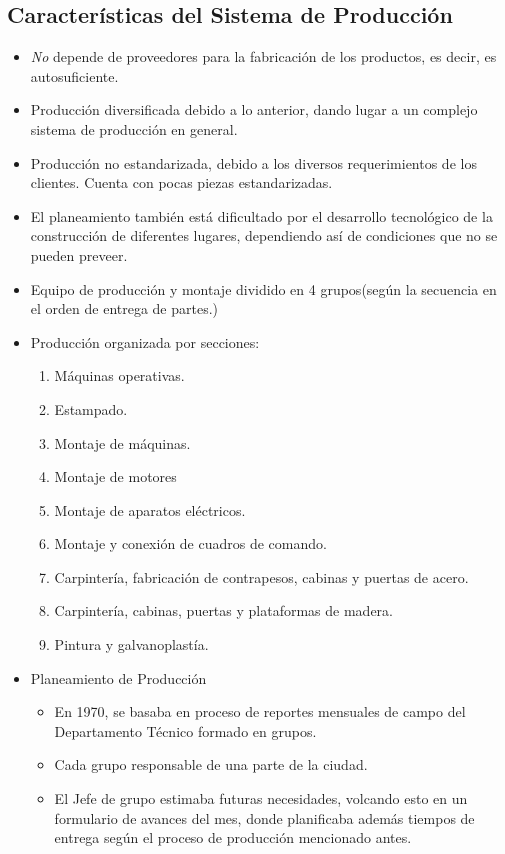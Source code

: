 \documentclass[12pt,a4paper,spanish]{article}
\begin{document}
\subsection{Caracter\'{i}sticas del Sistema de Producci\'{o}n}
\begin{itemize}
	\item \emph{No} depende de proveedores para la fabricaci\'{o}n de los productos, es decir, es autosuficiente.
	\item Producci\'{o}n diversificada debido a lo anterior, dando lugar a un complejo sistema de producci\'on en general.
	\item Producci\'{o}n no estandarizada, debido a los diversos requerimientos de los clientes. Cuenta con pocas piezas estandarizadas.
	\item El planeamiento tambi\'{e}n est\'a dificultado por el desarrollo tecnol\'ogico de la construcci\'on de diferentes lugares, dependiendo as\'i de condiciones que no se pueden preveer.
	\item Equipo de producci\'{o}n y montaje dividido en 4 grupos(seg\'{u}n la secuencia en el orden de entrega de partes.)
	\item Producci\'{o}n organizada por secciones:
	\begin{enumerate}
		\item M\'{a}quinas operativas.
		\item Estampado.
		\item Montaje de m\'{a}quinas.
		\item Montaje de motores
		\item Montaje de aparatos el\'{e}ctricos.
		\item Montaje y conexi\'{o}n de cuadros de comando.
		\item Carpinter\'{i}a, fabricaci\'{o}n de contrapesos, cabinas y 	puertas de acero.
		\item Carpinter\'ia, cabinas, puertas y plataformas de madera.
		\item Pintura y galvanoplast\'ia.
	\end{enumerate}
	\item Planeamiento de Producci\'{o}n
	\begin{itemize}
		\item En 1970, se basaba en proceso de reportes mensuales de campo del Departamento T\'{e}cnico formado en grupos.
		\item Cada grupo responsable de una parte de la ciudad.
		\item El Jefe de grupo estimaba futuras necesidades, volcando esto en un formulario de avances del mes, donde planificaba adem\'{a}s tiempos de entrega seg\'{u}n el proceso de producci\'{o}n mencionado antes.

\end{itemize}
\end{itemize}
\end{document}
